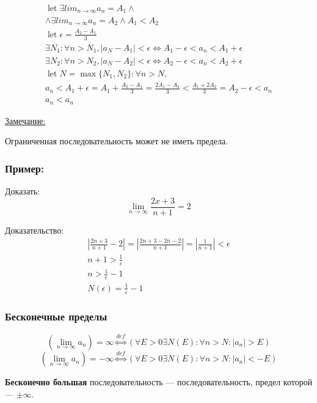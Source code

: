 \documentclass{article}
\DeclareMathOperator*{\Let}{let}
\begin{document}
\begin{gather*}
	\Let \exists lim_{n \to \infty} a_n = A_1 \land \\
	\land \exists lim_{n \to \infty} a_n = A_2 \land A_1 < A_2 \\
	\Let \epsilon = \frac{A_2 - A_1}{3} \\
	\exists N_1 : \forall n > N_1, |a_N - A_1| < \epsilon \Leftrightarrow
	A_1 - \epsilon < a_n < A_1 + \epsilon \\
	\exists N_2 : \forall n > N_2, |a_N - A_2| < \epsilon \Leftrightarrow
	A_2 - \epsilon < a_n < A_2 + \epsilon \\
	\Let N = \max\{N_1, N_2\} : \forall n > N, \\
	a_n < A_1 + \epsilon = A_1 + \frac{A_2 - A_1}{3} = \frac{2A_1 - A_2}{3} < \frac{A_1 + 2A_2}{3} = A_2 - \epsilon < a_n \\
	a_n < a_n
\end{gather*}

\underline{Замечание:}

Ограниченная последовательность может не иметь предела.

\subsubsection*{Пример:}

Доказать:
\[
	\lim_{n \to \infty} \frac{2x + 3}{n + 1} = 2
\]

Доказательство:
\begin{gather*}
	|\frac{2n + 3}{n + 1} - 2| = |\frac{2n + 3 - 2n - 2}{n + 1}| = |\frac{1}{n + 1}| < \epsilon \\
	n + 1 > \frac{1}{\epsilon} \\
	n > \frac{1}{\epsilon} - 1 \\
	N(\epsilon) = \frac{1}{\epsilon} - 1
\end{gather*}

\subsubsection{Бесконечные пределы}

\[
(\lim_{n \to \infty} a_n) = \infty \stackrel{def}{\Leftrightarrow} (\forall E > 0 \exists N(E) : \forall n > N : |a_n| > E)
\]
\[
(\lim_{n \to \infty} a_n) = -\infty \stackrel{def}{\Leftrightarrow} (\forall E > 0 \exists N(E) : \forall n > N : |a_n| < -E)
\]

\textbf{Бесконечно большая} последовательность --- последовательность, предел которой --- $\pm \infty$.
\end{document}
